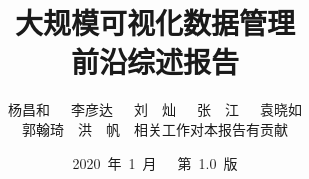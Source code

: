 \documentclass[12pt]{article}
\title{大规模可视化数据管理 \\ 前沿综述报告}
\author{杨昌和\ \ \ 李彦达\ \ \ 刘\ \ 灿\ \ \ 张\ \ 江\ \ \ 袁晓如 
 \\郭翰琦\ \ 洪\ \ 帆\ \ 相关工作对本报告有贡献}
\date{2020\ 年\ 1\ 月\ \ \ 第\ 1.0\ 版}
\begin{document}
\begin{spacing}{1.5}
\begin{CJK*}{UTF8}{gbsn}
\renewcommand{\refname}{参考文献}



\clearpage
\maketitle

\clearpage
\tableofcontents

\clearpage

\clearpage

\clearpage

\clearpage

\clearpage

\clearpage

\printbibliography[heading = bibintoc]
% 
% 

\end{CJK*}
\end{spacing}
\end{document}
